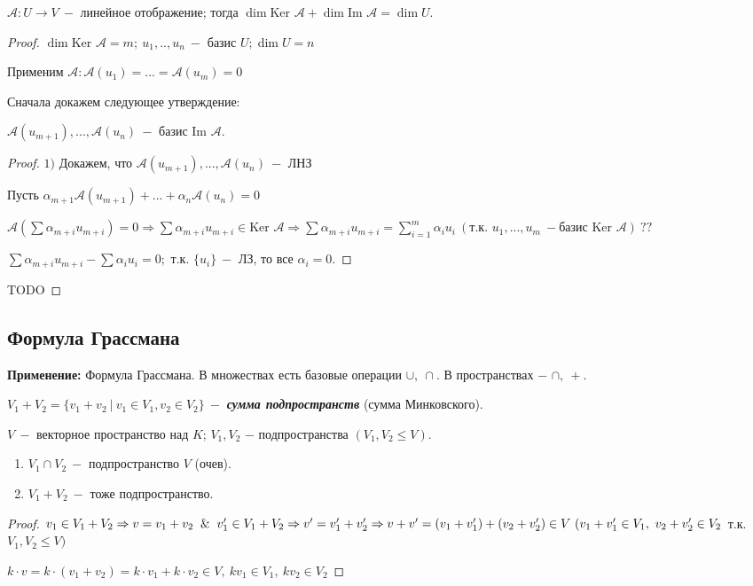 \begin{theorem}
    $\mathcal{A}:U\rightarrow V\ -$ линейное отображение; тогда $\dim 
\text{Ker }\mathcal{A}+\dim \text{Im }\mathcal{A}=\dim U$.
\end{theorem}

\begin{proof}
    $\dim \text{Ker }\mathcal{A}=m;\ u_1,..,u_n\ -$ базис $U; \dim U=n$

    Применим $\mathcal{A}:\mathcal{A}(u_1)=...=\mathcal{A}(u_m)=0$

    Сначала докажем следующее утверждение:
    
    \begin{statement}
        $\mathcal{A}(u_{m+1}),...,\mathcal{A}(u_n)\ -$ базис $\text{Im 
}\mathcal{A}$.
    \end{statement}
    \begin{proof}
        $1)$ Докажем, что $\mathcal{A}(u_{m+1}),...,\mathcal{A}(u_n)\ -$ 
ЛНЗ

        Пусть 
$\alpha_{m+1}\mathcal{A}(u_{m+1})+...+\alpha_n\mathcal{A}(u_n)=0$

        $\mathcal{A}(\sum\alpha_{m+i}u_{m+i})=0\Rightarrow \sum 
\alpha_{m+i}u_{m+i}\in \text{Ker }\mathcal{A}\Rightarrow \sum 
\alpha_{m+i}u_{m+i}=\sum\limits_{i=1}^m\alpha_{i}u_{i}\ (\text{т.к. 
}u_1,...,u_m\ -\text{базис Ker }\mathcal{A})\  ??$

        $\sum \alpha_{m+i}u_{m+i}-\sum\alpha_{i}u_{i}=0;$ т.к. $\{u_i\}\ 
-$ ЛЗ, то все $\alpha_i=0$.
    \end{proof}
    TODO
\end{proof}

\subsection{Формула Грассмана}
\textbf{Применение:} Формула Грассмана. В множествах есть базовые операции 
$\cup,\ \cap$. В пространствах $-$ $\cap,\ +$.

\begin{definition}
     $V_1+V_2=\{v_1+v_2\ |\ v_1\in V_1,v_2\in V_2\}\ -$ 
\textbf{\textit{сумма подпространств}} (сумма Минковского).
\end{definition}

\begin{theorem}
    $V\ -$ векторное пространство над $K$; $V_1,V_2$ $-$ подпространства 
$(V_1,V_2\leq V)$. 
    \begin{enumerate}
        \item $V_1\cap V_2\ -$ подпространство $V$ (очев).
        \item $V_1+V_2\ -$ тоже подпространство.
    \end{enumerate}    
\end{theorem}
\begin{proof}
     $v_1\in V_1+V_2\Rightarrow v=v_1+v_2\And v'_1\in V_1+V_2\Rightarrow 
v'=v'_1+v'_2\Rightarrow v+v'=(v_1+v'_1)+(v_2+v'_2)\in V\ (v_1+v'_1\in 
V_1,\ v_2+v'_2\in V_2\ $т.к. $V_1,V_2\leq V)$

    $k\cdot v=k\cdot (v_1+v_2)=k\cdot v_1+k\cdot v_2\in V,\ kv_1\in V_1,\ 
kv_2\in V_2$
\end{proof}

